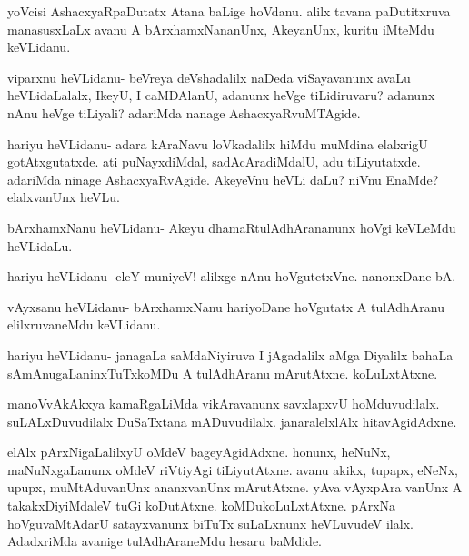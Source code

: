 \documentclass{article}
\begin{document}
\begin{mng}%
yoVcisi AshacxyaRpaDutatx Atana baLige hoVdanu. alilx tavana
paDutitxruva manasusxLaLx avanu A bArxhamxNananUnx, AkeyanUnx, kuritu
iMteMdu keVLidanu.
\end{mng}

\begin{mng}%
viparxnu heVLidanu- beVreya deVshadalilx naDeda viSayavanunx
avaLu heVLidaLalalx, IkeyU, I caMDAlanU, adanunx heVge tiLidiruvaru?
adanunx nAnu heVge tiLiyali? adariMda nanage AshacxyaRvuMTAgide.
\end{mng}

\begin{mng}%
hariyu heVLidanu- adara kAraNavu loVkadalilx hiMdu
muMdina elalxrigU gotAtxgutatxde. ati puNayxdiMdal, sadAcAradiMdalU,
adu tiLiyutatxde. adariMda ninage AshacxyaRvAgide. AkeyeVnu heVLi
daLu? niVnu EnaMde? elalxvanUnx heVLu.
\end{mng}

\begin{mng}%
bArxhamxNanu heVLidanu- Akeyu dhamaRtulAdhArananunx hoVgi
keVLeMdu heVLidaLu.
\end{mng}

\begin{mng}%
hariyu heVLidanu- eleY muniyeV! alilxge nAnu hoVgutetxVne.
nanonxDane bA.
\end{mng}

\begin{mng}%
vAyxsanu heVLidanu- bArxhamxNanu hariyoDane hoVgutatx A
tulAdhAranu elilxruvaneMdu keVLidanu.
\end{mng}

\begin{mng}%
hariyu heVLidanu- janagaLa saMdaNiyiruva I jAgadalilx aMga
Diyalilx bahaLa sAmAnugaLaninxTuTxkoMDu A tulAdhAranu mArutAtxne.
koLuLxtAtxne.
\end{mng}

\begin{mng}%
manoVvAkAkxya kamaRgaLiMda vikAravanunx savxlapxvU hoMduvudilalx.
suLALxDuvudilalx DuSaTxtana mADuvudilalx. janaralelxlAlx hitavAgidAdxne.
\end{mng}

\begin{mng}%
elAlx pArxNigaLalilxyU oMdeV bageyAgidAdxne. honunx,
heNuNx, maNuNxgaLanunx oMdeV riVtiyAgi tiLiyutAtxne. avanu akikx, tupapx,
eNeNx, upupx, muMtAduvanUnx ananxvanUnx mArutAtxne. yAva vAyxpAra
vanUnx A takakxDiyiMdaleV tuGi koDutAtxne. koMDukoLuLxtAtxne. pArxNa
hoVguvaMtAdarU satayxvanunx biTuTx suLaLxnunx heVLuvudeV ilalx. AdadxriMda avanige tulAdhAraneMdu hesaru baMdide.
\end{mng}
\end{document}
